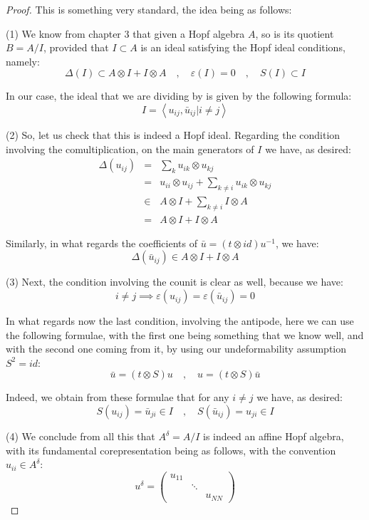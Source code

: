 \documentclass[12pt]{amsbook}
\begin{document}
\begin{proof}
This is something very standard, the idea being as follows:

\medskip

(1) We know from chapter 3 that given a Hopf algebra $A$, so is its quotient $B=A/I$, provided that $I\subset A$ is an ideal satisfying the Hopf ideal conditions, namely:
$$\Delta(I)\subset A\otimes I+I\otimes A\quad,\quad\varepsilon(I)=0\quad,\quad S(I)\subset I$$

In our case, the ideal that we are dividing by is given by the following formula:
$$I=\left<u_{ij},\bar{u}_{ij}\Big|i\neq j\right>$$

(2) So, let us check that this is indeed a Hopf ideal. Regarding the condition involving the comultiplication, on the main generators of $I$ we have, as desired:
\begin{eqnarray*}
\Delta(u_{ij})
&=&\sum_ku_{ik}\otimes u_{kj}\\
&=&u_{ii}\otimes u_{ij}+\sum_{k\neq i}u_{ik}\otimes u_{kj}\\
&\in&A\otimes I+\sum_{k\neq i}I\otimes A\\
&=&A\otimes I+I\otimes A
\end{eqnarray*}

Similarly, in what regards the coefficients of $\bar{u}=(t\otimes id)u^{-1}$, we have:
$$\Delta(\bar{u}_{ij})\in A\otimes I+I\otimes A$$

(3) Next, the condition involving the counit is clear as well, because we have:
$$i\neq j\implies\varepsilon(u_{ij})=\varepsilon(\bar{u}_{ij})=0$$

In what regards now the last condition, involving the antipode, here we can use the following formulae, with the first one being something that we know well, and with the second one coming from it, by using our undeformability assumption $S^2=id$: 
$$\bar{u}=(t\otimes S)u\quad,\quad u=(t\otimes S)\bar{u}$$

Indeed, we obtain from these formulae that for any $i\neq j$ we have, as desired:
$$S(u_{ij})=\bar{u}_{ji}\in I\quad,\quad 
S(\bar{u}_{ij})=u_{ji}\in I$$

(4) We conclude from all this that $A^\delta=A/I$ is indeed an affine Hopf algebra, with its fundamental corepresentation being as follows, with the convention $u_{ii}\in A^\delta$:
$$u^\delta=\begin{pmatrix}
u_{11}\\
&\ddots\\
&&u_{NN}
\end{pmatrix}$$


\end{proof}
\end{document}
